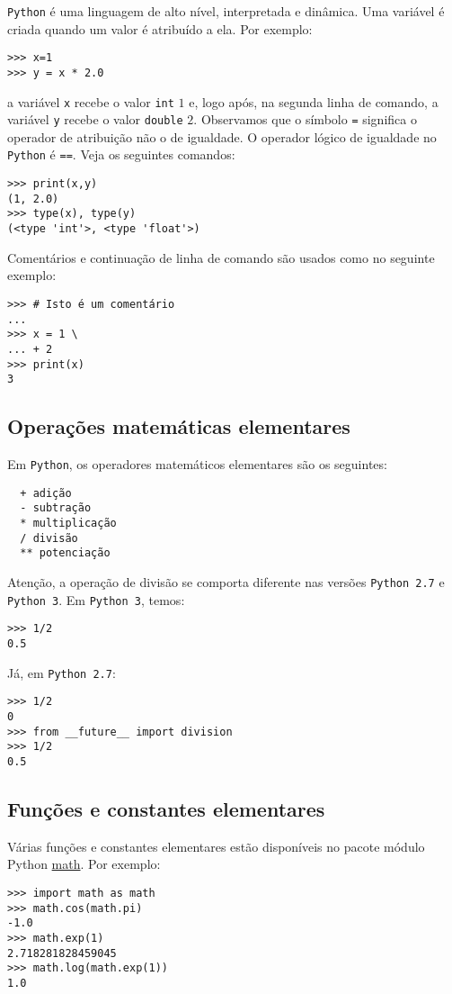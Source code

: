 \verb+Python+ é uma linguagem de alto nível, interpretada e dinâmica. Uma variável é criada quando um valor é atribuído a ela. Por exemplo:
\begin{verbatim}
>>> x=1
>>> y = x * 2.0
\end{verbatim}
a variável \verb+x+ recebe o valor \verb+int+ $1$ e, logo após, na segunda linha de comando, a variável \verb+y+ recebe o valor \verb+double+ $2$. Observamos que o símbolo \verb+=+ significa o operador de atribuição não o de igualdade. O operador lógico de igualdade no \verb+Python+ é \verb+==+. Veja os seguintes comandos:
\begin{verbatim}
>>> print(x,y)
(1, 2.0)
>>> type(x), type(y)
(<type 'int'>, <type 'float'>)
\end{verbatim}

Comentários e continuação de linha de comando são usados como no seguinte exemplo:
\begin{verbatim}
>>> # Isto é um comentário
...
>>> x = 1 \
... + 2
>>> print(x)
3
\end{verbatim}

\subsection{Operações matemáticas elementares}

Em \verb+Python+, os operadores matemáticos elementares são os seguintes:
\begin{verbatim}
  + adição
  - subtração
  * multiplicação
  / divisão
  ** potenciação
\end{verbatim}

Atenção, a operação de divisão se comporta diferente nas versões \verb+Python 2.7+ e \verb+Python 3+. Em \verb+Python 3+, temos:
\begin{verbatim}
>>> 1/2
0.5
\end{verbatim}
Já, em \verb+Python 2.7+:
\begin{verbatim}
>>> 1/2
0
>>> from __future__ import division
>>> 1/2
0.5
\end{verbatim}

\subsection{Funções e constantes elementares}

Várias funções e constantes elementares estão disponíveis no pacote módulo Python \href{https://docs.python.org/3/library/math.html?highlight=math#module-math}{math}. Por exemplo:
\begin{verbatim}
>>> import math as math
>>> math.cos(math.pi)
-1.0
>>> math.exp(1)
2.718281828459045
>>> math.log(math.exp(1))
1.0
\end{verbatim}

